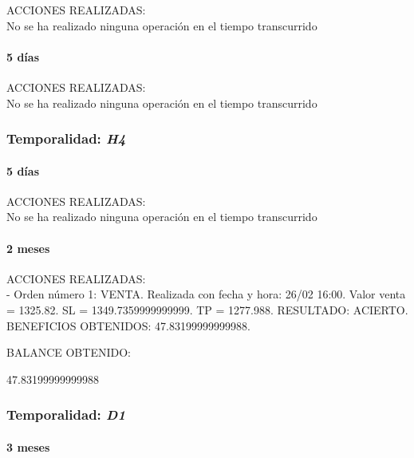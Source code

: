 ACCIONES REALIZADAS:\\

No se ha realizado ninguna operación en el tiempo transcurrido

\paragraph{5 días}

ACCIONES REALIZADAS:\\

No se ha realizado ninguna operación en el tiempo transcurrido

\subsubsection{Temporalidad: \textit{H4}}

\paragraph{5 días}

ACCIONES REALIZADAS:\\

No se ha realizado ninguna operación en el tiempo transcurrido

\paragraph{2 meses}

ACCIONES REALIZADAS:\\

- Orden número 1: VENTA. Realizada con fecha y hora: 26/02 16:00. Valor venta = 1325.82. SL = 1349.7359999999999. TP = 1277.988. RESULTADO: ACIERTO. BENEFICIOS OBTENIDOS: 47.83199999999988.\newline


\color{blue}
BALANCE OBTENIDO:\newline

47.83199999999988\newline
\color{black}

\subsubsection{Temporalidad: \textit{D1}}

\paragraph{3 meses}

